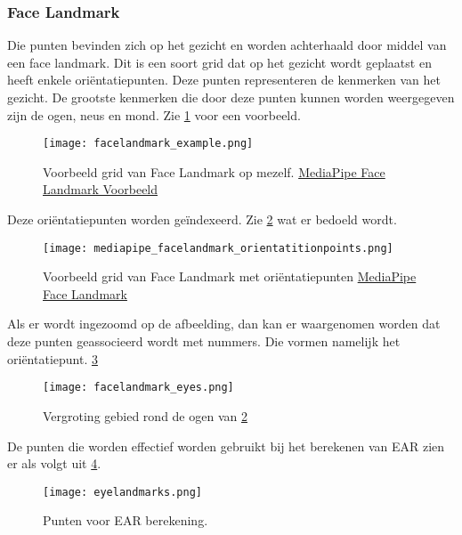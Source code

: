 \subsubsection{Face Landmark}
Die punten bevinden zich op het gezicht en worden achterhaald door middel van een face landmark. Dit is een soort grid dat op het gezicht wordt geplaatst en heeft enkele oriëntatiepunten. Deze punten representeren de kenmerken van het gezicht. De grootste kenmerken die door deze punten kunnen worden weergegeven zijn de ogen, neus en mond. Zie \ref{fig:facelandmark} voor een voorbeeld.
\begin{figure}[h]
    \centering
    \texttt{[image: facelandmark\_example.png]}
    \caption{Voorbeeld grid van Face Landmark op mezelf. \href{https://mediapipe-studio.webapps.google.com/demo/face_landmarker}{MediaPipe Face Landmark Voorbeeld}}
    \label{fig:facelandmark}
\end{figure}
Deze oriëntatiepunten worden geïndexeerd. Zie \ref{fig:facelandmarkpoints} wat er bedoeld wordt.
\begin{figure}[h]
    \centering
    \texttt{[image: mediapipe\_facelandmark\_orientatitionpoints.png]}
    \caption{Voorbeeld grid van Face Landmark met oriëntatiepunten \href{https://ai.google.dev/edge/mediapipe/solutions/vision/face_landmarker}{MediaPipe Face Landmark}}
    \label{fig:facelandmarkpoints}
\end{figure}

Als er wordt ingezoomd op de afbeelding, dan kan er waargenomen worden dat deze punten geassocieerd wordt met nummers. Die vormen namelijk het oriëntatiepunt. \ref{fig:eyelandmarks_mediapipe}
\begin{figure}[h]
    \centering
    \texttt{[image: facelandmark\_eyes.png]}
    \caption{Vergroting gebied rond de ogen van \ref{fig:facelandmarkpoints}}
    \label{fig:eyelandmarks_mediapipe}
\end{figure}

De punten die worden effectief worden gebruikt bij het berekenen van EAR zien er als volgt uit \ref{fig:eyelandmarks}.
\begin{figure}[h]
    \centering
    \texttt{[image: eyelandmarks.png]}
    \caption{Punten voor EAR berekening.}
    \label{fig:eyelandmarks}
\end{figure}


